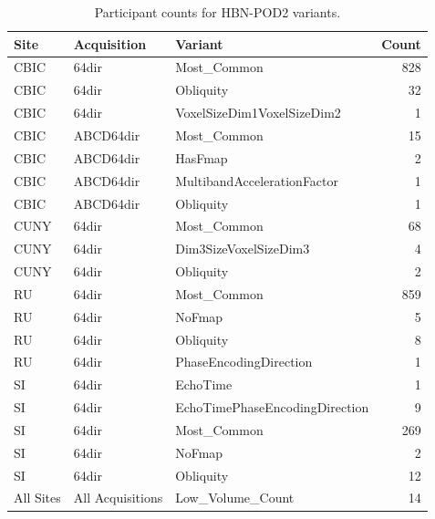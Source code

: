 \documentclass[fleqn,10pt,inline]{wlscirep}
\begin{document}
\begin{table}[htbp]
\centering
\begin{tabular}{lllr}
\toprule
     Site &      Acquisition &                        Variant &  Count \\
\midrule
     CBIC &            64dir &                    Most\_Common &    828 \\
     CBIC &            64dir &                      Obliquity &     32 \\
     CBIC &            64dir &     VoxelSizeDim1VoxelSizeDim2 &      1 \\
     CBIC &        ABCD64dir &                    Most\_Common &     15 \\
     CBIC &        ABCD64dir &                        HasFmap &      2 \\
     CBIC &        ABCD64dir &    MultibandAccelerationFactor &      1 \\
     CBIC &        ABCD64dir &                      Obliquity &      1 \\
     CUNY &            64dir &                    Most\_Common &     68 \\
     CUNY &            64dir &          Dim3SizeVoxelSizeDim3 &      4 \\
     CUNY &            64dir &                      Obliquity &      2 \\
       RU &            64dir &                    Most\_Common &    859 \\
       RU &            64dir &                         NoFmap &      5 \\
       RU &            64dir &                      Obliquity &      8 \\
       RU &            64dir &         PhaseEncodingDirection &      1 \\
       SI &            64dir &                       EchoTime &      1 \\
       SI &            64dir & EchoTimePhaseEncodingDirection &      9 \\
       SI &            64dir &                    Most\_Common &    269 \\
       SI &            64dir &                         NoFmap &      2 \\
       SI &            64dir &                      Obliquity &     12 \\
All Sites & All Acquisitions &               Low\_Volume\_Count &     14 \\
\bottomrule
\end{tabular}
\caption{%
  Participant counts for HBN-POD2 variants.
  \label{tab:variants}
}
\end{table}
\end{document}
